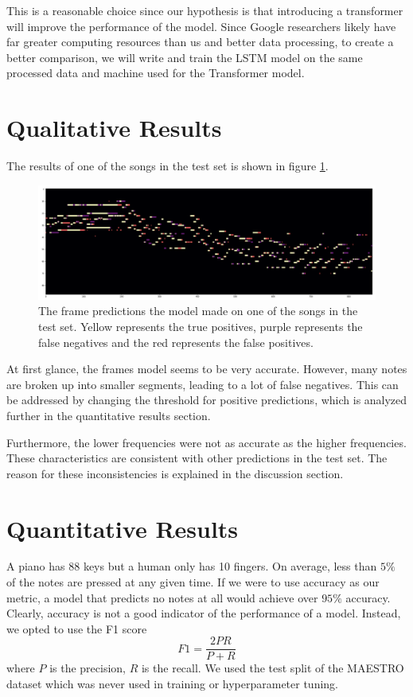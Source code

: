 \documentclass[a4paper,twocolumn,10pt]{article}
\begin{document}
This is a reasonable choice since our hypothesis is that introducing a transformer will improve the performance of the model. Since Google researchers likely have far greater computing resources than us and better data processing, to create a better comparison, we will write and train the LSTM model on the same processed data and machine used for the Transformer model.  

\section{Qualitative Results}
The results of one of the songs in the test set is shown in figure \ref{fig:results}.
\begin{figure}[h!]
  \centering
  \includegraphics[width=\linewidth]{figures/results.png}
  \caption{The frame predictions the model made on one of the songs in the test set. Yellow represents the true positives, purple represents the false negatives and the red represents the false positives.}
  \label{fig:results}
\end{figure}
At first glance, the frames model seems to be very accurate. However, many notes are broken up into smaller segments, leading to a lot of false negatives. This can be addressed by changing the threshold for positive predictions, which is analyzed further in the quantitative results section.

Furthermore, the lower frequencies were not as accurate as the higher frequencies. These characteristics are consistent with other predictions in the test set. The reason for these inconsistencies is explained in the discussion section.
\section{Quantitative Results}

A piano has 88 keys but a human only has 10 fingers. On average, less than $5\%$ of the notes are pressed at any given time. If we were to use accuracy as our metric, a model that predicts no notes at all would achieve over $95\%$ accuracy. Clearly, accuracy is not a good indicator of the performance of a model. Instead, we opted to use the F1 score
\begin{equation}
  F1 = \frac{2PR}{P+R}
\end{equation}
where $P$ is the precision, $R$ is the recall. We used the test split of the MAESTRO dataset which was never used in training or hyperparameter tuning.
\end{document}
